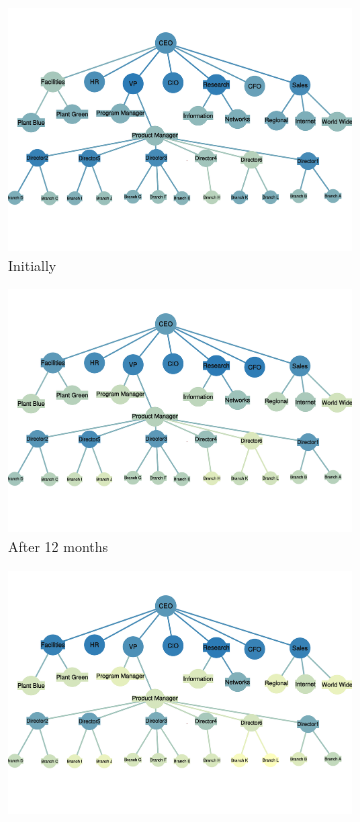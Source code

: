 \documentclass[tcn = 37075, sheet = false, abstract = false]{mcmthesis}
\begin{document}
	\begin{figure}[t!]
		\centering
		\begin{subfigure}[h]{0.45\textwidth}
			\includegraphics[width=\textwidth]{figures/0.pdf}
			\caption{Initially}
		\end{subfigure}%
		\begin{subfigure}[h]{0.45\textwidth}
			\includegraphics[width=\textwidth]{figures/12.pdf}
			\caption{After 12 months}
		\end{subfigure}
		\begin{subfigure}[h]{0.45\textwidth}
			\includegraphics[width=\textwidth]{figures/18.pdf}

\end{subfigure}
\end{figure}
\end{document}
